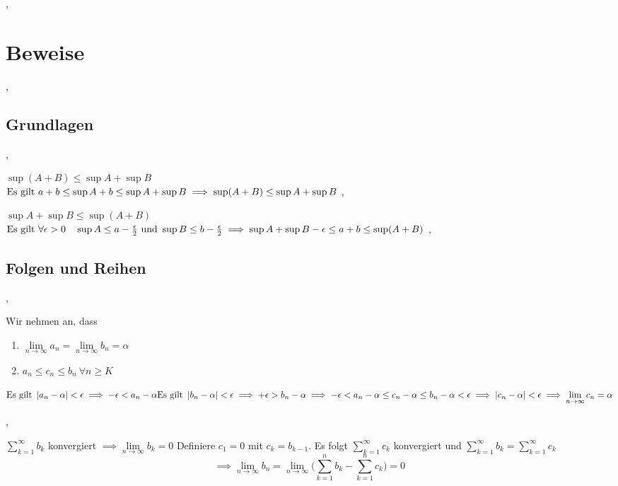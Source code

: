 \sep

\section{Beweise}
\sep
\subsection{Grundlagen}
\sep

\Beweis $\sup (A + B) \leq \sup A + \sup B$ \\
\(
\text{Es gilt } a + b \leq \sup A + b \leq \sup A + \sup B \\
\implies \sup (A + B) \leq \sup A + \sup B
\)
\sep

\Beweis $\sup A + \sup B \leq \sup(A + B)$  \\
\(
\text{Es gilt } \forall \epsilon > 0 \quad \sup A \leq a -  \frac{\epsilon}{2} \text{ und } \sup B \leq b -  \frac{\epsilon}{2} \\
\implies \sup A + \sup B - \epsilon \leq a + b \leq \sup (A + B) 
\)
\sep

\subsection{Folgen und Reihen}
\sep

 Wir nehmen an, dass 
\begin{enumerate}
\item $\lim\limits_{n \rightarrow \infty} a_{n} = \lim\limits_{n \rightarrow \infty} b_{n} = \alpha$ 
\item $a_{n} \leq c_{n} \leq b_{n} \ \forall n \geq K$
\end{enumerate}

\(
\text{Es gilt } \left\lvert a_n - \alpha \right\rvert < \epsilon \implies - \epsilon < a_n - \alpha \\
\text{Es gilt } \left\lvert b_n - \alpha \right\rvert < \epsilon \implies + \epsilon > b_n - \alpha \\
\implies - \epsilon < a_n - \alpha \leq c_n - \alpha \leq b_n - \alpha < \epsilon \\
\implies \left\lvert c_n - \alpha \right\rvert < \epsilon \implies \lim\limits_{n \rightarrow \infty} c_{n} = \alpha
\)

\sep

\Beweis $\sum\limits_{k=1}^{\infty} b_k$ konvergiert $ \implies \lim \limits_{n \rightarrow \infty} b_k = 0$
Definiere $c_1 = 0$ mit $c_k = b_{k - 1}$. Es folgt $\sum\limits_{k=1}^{\infty} c_k$ konvergiert und $ \sum\limits_{k=1}^{\infty} b_k = \sum\limits_{k=1}^{\infty} c_k$ 
\[ \implies \lim \limits_{n \rightarrow \infty} b_n = \lim \limits_{n \rightarrow \infty} \Big(\sum\limits_{k= 1}^n b_k - \sum_{k=1}^n c_k \Big ) = 0\]

